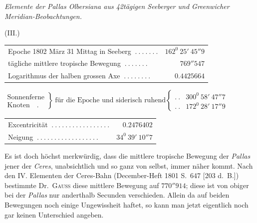 \begin{center}
\textit{Elemente der Pallas Olbersiana aus 42tägigen Seeberger und Greenwicher Meridian-Beobachtungen.}\par\medskip
(III.)\par\medskip
{\small\setlength{\tabcolsep}{2pt}
\begin{tabular}{l r}
Epoche 1802 März 31 Mittag in Seeberg $\ .\ .\ .\ .\ .\ .\ .$&$162^0\ 25'\ 45''9$\\
tägliche mittlere tropische Bewegung $\ .\ .\ .\ .\ .\ .\ .$&$769''547$\\
Logarithmus der halben grossen Axe $\ .\ .\ .\ .\ .\ .\ .\ .$&$0.4425664$
\end{tabular}
\par\smallskip
$\left.\begin{array}{l}\text{Sonnenferne}\\\text{Knoten}\quad .\end{array}\right\}\ \text{für die Epoche und siderisch ruhend}\left\{\begin{array}{lr}
.\ .&300^0\ 58'\ 47''7\\
.\ .&172^0\ 28'\ 17''9
\end{array}\right.$
\par\smallskip
\begin{tabular}{l r}
Excentricität $\ .\ .\ .\ .\ .\ .\ .\ .\ .\ .\ .\ .\ .\ .\ .\ .\ .$&$0.2476402$\\
Neigung $\ .\ .\ .\ .\ .\ .\ .\ .\ .\ .\ .\ .\ .\ .\ .\ .\ .\ .$&$34^0\ 39'\ 10''7$
\end{tabular}}
\end{center}

Es ist doch höchst merkwürdig, dass die mittlere tropische Bewegung der \textit{Pallas} jener der \textit{Ceres}, unabsichtlich und so ganz von selbst, immer näher kommt. Nach den IV. Elementen der Ceres-Bahn (December-Heft 1801 S.\ 647 [203 d.\ B.]) bestimmte Dr.\ \textsc{Gauss} diese mittlere Bewegung auf $770''914$; diese ist von obiger bei der \textit{Pallas} nur anderthalb Secunden verschieden. Allein da auf beiden Bewegungen noch einige Ungewissheit haftet, so kann man jetzt eigentlich noch gar keinen Unterschied angeben.

